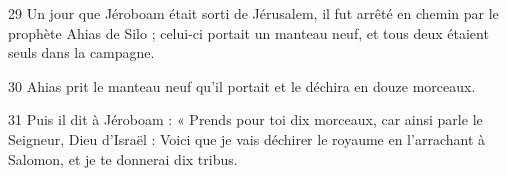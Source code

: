 
29 Un jour que Jéroboam était sorti de Jérusalem, il fut arrêté en chemin par le prophète Ahias de Silo ; celui-ci portait un manteau neuf, et tous deux étaient seuls dans la campagne.

30 Ahias prit le manteau neuf qu’il portait et le déchira en douze morceaux.

31 Puis il dit à Jéroboam : « Prends pour toi dix morceaux, car ainsi parle le Seigneur, Dieu d’Israël : Voici que je vais déchirer le royaume en l’arrachant à Salomon, et je te donnerai dix tribus.

